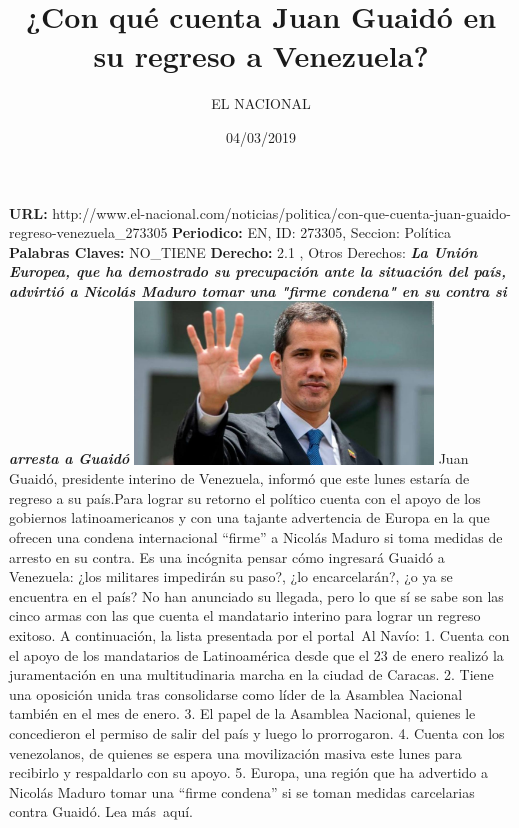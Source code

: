\documentclass{article}%
\title{\textbf{¿Con qué cuenta Juan Guaidó en su regreso a Venezuela?}}%
\author{EL NACIONAL}%
\date{04/03/2019}%
\begin{document}
%
\normalsize%
\maketitle%
\textbf{URL: }%
http://www.el{-}nacional.com/noticias/politica/con{-}que{-}cuenta{-}juan{-}guaido{-}regreso{-}venezuela\_273305\newline%
%
\textbf{Periodico: }%
EN, %
ID: %
273305, %
Seccion: %
Política\newline%
%
\textbf{Palabras Claves: }%
NO\_TIENE\newline%
%
\textbf{Derecho: }%
2.1%
, Otros Derechos: %
\newline%
%
\textbf{\textit{La Unión Europea, que ha demostrado su precupación ante la situación del país, advirtió a Nicolás Maduro tomar una "firme condena" en su contra si arresta a Guaidó}}%
\newline%
\newline%
%
\includegraphics[width=300px]{EN_273305.jpg}%
\newline%
%
Juan Guaidó, presidente interino de Venezuela, informó que este lunes estaría de regreso a su país.Para lograr su retorno el político cuenta con el apoyo de los gobiernos latinoamericanos y con una tajante advertencia de Europa en la que ofrecen una condena internacional “firme” a Nicolás Maduro si toma medidas de arresto en su contra.%
\newline%
%
Es una incógnita pensar cómo ingresará Guaidó a Venezuela: ¿los militares impedirán su paso?, ¿lo encarcelarán?, ¿o ya se encuentra en el país? No han anunciado su llegada, pero lo que sí se sabe son las cinco armas con las que cuenta el mandatario interino para lograr un regreso exitoso.%
\newline%
%
A continuación, la lista presentada por el portal~Al Navío:%
\newline%
%
1. Cuenta con el apoyo de los mandatarios de Latinoamérica desde que el 23 de enero realizó la juramentación en una multitudinaria marcha en la ciudad de Caracas.%
\newline%
%
2. Tiene una oposición unida tras consolidarse como líder de la Asamblea Nacional también en el mes de enero.%
\newline%
%
3. El papel de la Asamblea Nacional, quienes le concedieron el permiso de salir del país y luego lo prorrogaron.%
\newline%
%
4. Cuenta con los venezolanos, de quienes se espera una movilización masiva este lunes para recibirlo y respaldarlo con su apoyo.%
\newline%
%
5. Europa, una región que ha advertido a Nicolás Maduro tomar una “firme condena” si se toman medidas carcelarias contra Guaidó.%
\newline%
%
Lea más~aquí.%
\newline%
%
\end{document}

